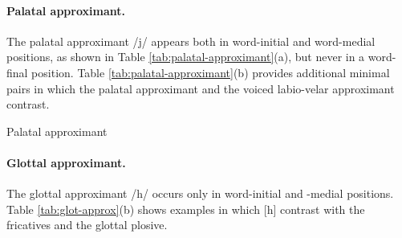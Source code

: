 \newpage 
\paragraph{Palatal approximant.}
The palatal approximant /{j}/  appears both in word-initial and word-medial
positions, as shown in Table  \ref{tab:palatal-approximant}(a),   but never in a
word-final position.   Table \ref{tab:palatal-approximant}(b) provides additional minimal pairs in which the
palatal approximant and the voiced labio-velar approximant contrast.

 
\begin{table} 

\caption{Palatal approximant\label{tab:palatal-approximant}}
\quad
{}


\end{table}



\paragraph{Glottal approximant.}
\label{sec:glot-approx}

The glottal approximant   /{h}/  
occurs only in word-initial and -medial positions.
Table \ref{tab:glot-approx}(b) shows examples in which [{h}]
contrast with the fricatives and the glottal plosive.

